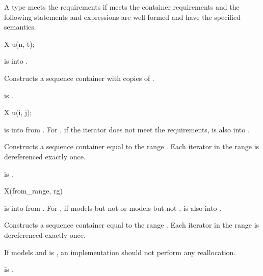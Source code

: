 \pnum
A type  meets the  requirements
if  meets the container requirements and
the following statements and expressions are well-formed and have
the specified semantics.

\begin{itemdecl}
X u(n, t);
\end{itemdecl}

\begin{itemdescr}
\pnum
\expects
{} is  into .

\pnum
\effects
Constructs a sequence container with  copies of .

\pnum
\ensures
{} is .
\end{itemdescr}

\begin{itemdecl}
X u(i, j);
\end{itemdecl}

\begin{itemdescr}
\pnum
\expects
{} is  into  from .
For ,
if the iterator does not meet
the  requirements,
 is also  into .

\pnum
\effects
Constructs a sequence container equal to the range \tcode{[i, j)}.
Each iterator in the range  is dereferenced exactly once.

\pnum
\ensures
{} is .
\end{itemdescr}

\begin{itemdecl}
X(from_range, rg)
\end{itemdecl}

\begin{itemdescr}
\pnum
\expects
{} is  into 
from .
For ,
if  models
but not  or models
but not ,
 is also  into .

\pnum
\effects
Constructs a sequence container equal to the range .
Each iterator in the range  is dereferenced exactly once.

\pnum
\recommended
If  models  and
 is ,
an implementation should not perform any reallocation.

\pnum
\ensures
{} is .
\end{itemdescr}

